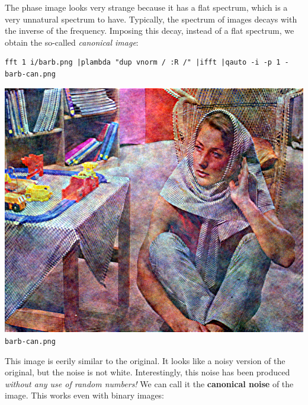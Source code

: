 The phase image looks very strange because it has a flat spectrum, which is a
very unnatural spectrum to have.  Typically, the spectrum of images decays
with the inverse of the frequency.  Imposing this decay, instead of a flat
spectrum, we obtain the so-called {\em canonical image}:

\begin{verbatim}
fft 1 i/barb.png |plambda "dup vnorm / :R /" |ifft |qauto -i -p 1 - barb-can.png
\end{verbatim}
\includegraphics{barb-can.png}{\small\tt barb-can.png}


This image is eerily similar to the original.  It looks like a noisy version
of the original, but the noise is not white.  Interestingly, this noise has
been produced \emph{without any use of random numbers!}  We can call it the
{\bf canonical noise} of the image.  This works even with binary images:


